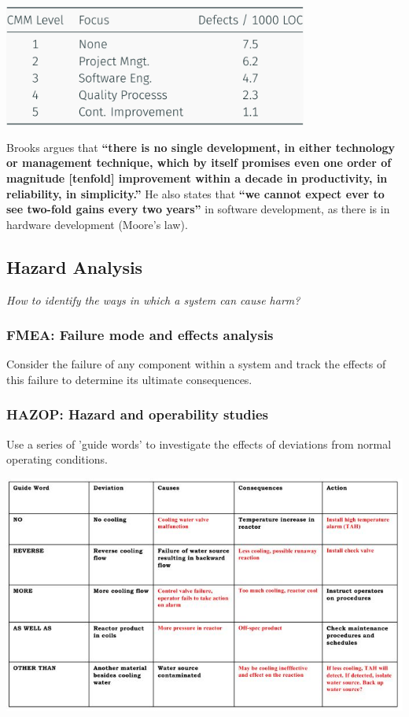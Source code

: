 \documentclass[
  10pt,
  a4paper,
  twocolumn]{article}
\begin{document}
\begin{center}
\includegraphics[width=\textwidth,height=4cm]{images/safety/image-31.png}
\end{center}

Brooks argues that \textbf{``there is no single development, in either
technology or management technique, which by itself promises even one
order of magnitude {[}tenfold{]} improvement within a decade in
productivity, in reliability, in simplicity.''} He also states that
\textbf{``we cannot expect ever to see two-fold gains every two years''}
in software development, as there is in hardware development (Moore's
law).

\subsection{Hazard Analysis}\label{hazard-analysis}

\vspace{-2mm}{\color{Orchid}\faQuestionCircle[regular]} \emph{How to
identify the ways in which a system can cause harm?}

\subsubsection{FMEA: Failure mode and effects
analysis}\label{fmea-failure-mode-and-effects-analysis}

Consider the failure of any component within a system and track the
effects of this failure to determine its ultimate consequences.

\subsubsection{HAZOP: Hazard and operability
studies}\label{hazop-hazard-and-operability-studies}

Use a series of 'guide words' to investigate the effects of deviations
from normal operating conditions.

\includegraphics{images/safety/image.png}
\end{document}
